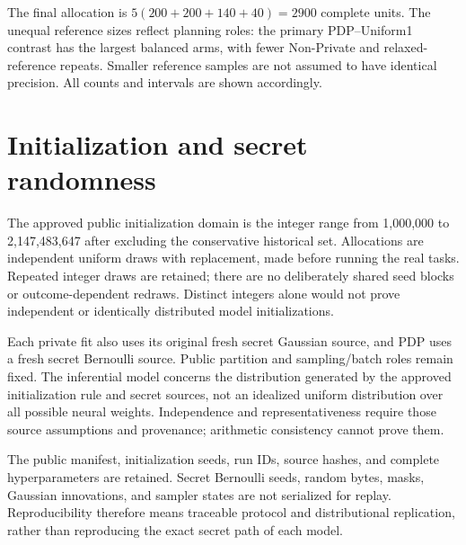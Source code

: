 The final allocation is $5(200+200+140+40)=2900$ complete units. The unequal reference sizes reflect planning roles: the primary PDP--Uniform1 contrast has the largest balanced arms, with fewer Non-Private and relaxed-reference repeats. Smaller reference samples are not assumed to have identical precision. All counts and intervals are shown accordingly.

\section{Initialization and secret randomness}
The approved public initialization domain is the integer range from 1,000,000 to 2,147,483,647 after excluding the conservative historical set. Allocations are independent uniform draws with replacement, made before running the real tasks. Repeated integer draws are retained; there are no deliberately shared seed blocks or outcome-dependent redraws. Distinct integers alone would not prove independent or identically distributed model initializations.

Each private fit also uses its original fresh secret Gaussian source, and PDP uses a fresh secret Bernoulli source. Public partition and sampling/batch roles remain fixed. The inferential model concerns the distribution generated by the approved initialization rule and secret sources, not an idealized uniform distribution over all possible neural weights. Independence and representativeness require those source assumptions and provenance; arithmetic consistency cannot prove them.

The public manifest, initialization seeds, run IDs, source hashes, and complete hyperparameters are retained. Secret Bernoulli seeds, random bytes, masks, Gaussian innovations, and sampler states are not serialized for replay. Reproducibility therefore means traceable protocol and distributional replication, rather than reproducing the exact secret path of each model.

